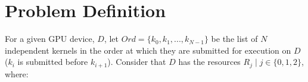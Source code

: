 \documentclass[conference]{IEEEtran}
\begin{document}

\section{Problem Definition}
\label{sec:ProblemDefinition}

For a given GPU device, $D$, let $Ord=\{k_0, k_1, ..., k_{N-1}\}$ be the list of $N$ independent kernels in the order at which they are submitted for execution on $D$ ($k_i$ is submitted before $k_{i+1}$). Consider that $D$ has the resources $R_j \mid j \in \{0,1,2\}$, where: 
\end{document}

